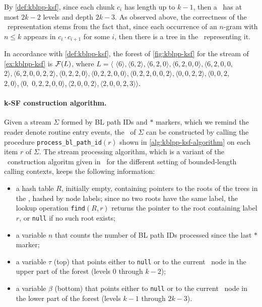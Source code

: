\noindent By \mydefinition\ref{def:kblpp-ksf}, since each chunk $c_i$ has length up to $k-1$, then a \ksf\ has at most $2k-2$ levels and depth $2k-3$. As observed above, the correctness of the \ksf\ representation stems from the fact that, since each occurrence of an $n$-gram with $n\le k$ appears in $c_i\cdot c_{i+1}$ for some $i$, then there is a tree in the \ksf\ representing it.

\begin{example} In accordance with \mydefinition\ref{def:kblpp-ksf}, the forest of \myfigure\ref{fig:kblpp-ksf} for the stream of \myexample\ref{ex:kblpp-ksf} is ${\cal F}(L)$, where $L=\langle$ $
\langle 6\rangle,
\langle 6, 2\rangle,
\langle 6, 2, 0\rangle,
\langle 6, 2, 0, 0\rangle,
\langle 6, 2, 0, 0,$
$
2\rangle,
\langle 6, 2, 0, 0, 2, 2\rangle,
\langle 0, 2, 2, 0\rangle,
\langle 0, 2, 2, 0, 0\rangle,
\langle 0, 2, 2, 0, 0, 2\rangle,
\langle 0, 0, 2, 2\rangle,
\langle 0, 0,2,$ $2, 0\rangle,
\langle 0,$
$
0, 2, 2, 0, 0\rangle,
\langle 2, 0, 0, 2\rangle,
\langle 2, 0, 0, 2, 3\rangle
\rangle$.
\end{example}

\paragraph*{k-SF construction algorithm.} Given a stream $\Sigma$ formed by BL path IDs and $*$ markers, which we remind the reader denote routine entry events, the \ksf\ of $\Sigma$ can be constructed by calling the procedure {\tt process\_bl\_path\_id}$(r)$ shown in \myalgorithm\ref{alg:kblpp-ksf-algorithm} on each item $r$ of $\Sigma$. The stream processing algorithm, which is a variant of the \ksf\ construction algoritm given in~\cite{Ausiello12} for the different setting of bounded-length calling contexts, keeps the following information:

\begin{itemize}[parsep=0pt]
\item a hash table $R$, initially empty, containing pointers to the roots of the trees in the \ksf, hashed by node labels; since no two roots have the same label, the lookup operation {\tt find}$(R, r)$ returns the pointer to the root containing label $r$, or {\tt null} if no such root exists;
\item a variable $n$ that counts the number of BL path IDs processed since the last $*$ marker;
\item a variable $\tau$ (top) that points either to {\tt null} or to the current \ksf\ node in the upper part of the forest (levels 0 through $k-2$);
\item a variable $\beta$ (bottom) that points either to {\tt null} or to the current \ksf\ node in the lower part of the forest (levels $k-1$ through $2k-3$).
\end{itemize}

